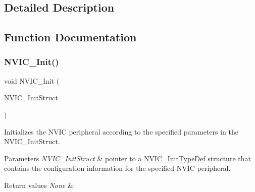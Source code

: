 \subsection{Detailed Description}


\subsection{Function Documentation}
\mbox{\label{group___m_i_s_c___exported___functions_ga4ab373ed0870c06fca5eb51d639adf41}} 
\subsubsection{\texorpdfstring{NVIC\_Init()}{NVIC\_Init()}}
{\footnotesize\ttfamily void N\+V\+I\+C\+\_\+\+Init (\begin{DoxyParamCaption}\item[{\mbox{\hyperlink{struct_n_v_i_c___init_type_def}{N\+V\+I\+C\+\_\+\+Init\+Type\+Def}} $\ast$}]{N\+V\+I\+C\+\_\+\+Init\+Struct }\end{DoxyParamCaption})}



Initializes the N\+V\+IC peripheral according to the specified parameters in the N\+V\+I\+C\+\_\+\+Init\+Struct. 


\begin{DoxyParams}{Parameters}
{\em N\+V\+I\+C\+\_\+\+Init\+Struct} & pointer to a \mbox{\hyperlink{struct_n_v_i_c___init_type_def}{N\+V\+I\+C\+\_\+\+Init\+Type\+Def}} structure that contains the configuration information for the specified N\+V\+IC peripheral. \\
\hline
\end{DoxyParams}

\begin{DoxyRetVals}{Return values}
{\em None} & \\
\hline
\end{DoxyRetVals}
\mbox{\label{group___m_i_s_c___exported___functions_gadfb1f34f803ce54c976643db8c484442}} 
